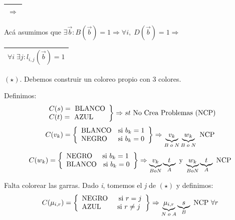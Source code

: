 \documentclass[12pt,a4paper]{report}
\newcounter{neq}
\begin{document}
  			\pagebreak
  			\begin{tabular}{|c|} \hline $\Rightarrow$ \\\hline \end{tabular}
  				\par Acá asumimos que $\exists \overrightarrow{b} : B(\overrightarrow{b}) = 1 \Rightarrow \forall i, \; D(\overrightarrow{b}) = 1 \Rightarrow$ \begin{tabular}{|c|} \hline $\forall i \; \exists j : l_{i, j}(\overrightarrow{b}) = 1$ \\ \hline \end{tabular} $(\star)$. Debemos construir un coloreo propio con 3 colores.
  				\vspace{3mm}
  				\par Definimos:
  				\begin{equation*}
  		  		\left.
  		  		\begin{array}{l}
  		    		C(s) = \textup{ BLANCO} \\
  		    		C(t) = \textup{ AZUL}
  		  		\end{array}
  		 			\right\rbrace
  		 			\Rightarrow s t \textup{ No Crea Problemas (NCP)}
  				\end{equation*}
  				\begin{equation*}
  					C(v_{k}) =
  					\left\lbrace
  		  		\begin{array}{l}
  		    		\textup{BLANCO \; si } b_{k} = 1 \\
  		    		\textup{NEGRO \; \; si } b_{k} = 0
  					\end{array}
  		 			\right\rbrace
  		 			\Rightarrow \underbrace{v_{k}}_{B \; o \; N} \underbrace{w_{k}}_{B \; o \; N} \textup{ NCP}
  				\end{equation*}
  				\begin{equation*}
  					C(w_{k}) =
  		  		\left\lbrace
  					\begin{array}{l}
  	  		 		\textup{NEGRO \; \, si } b_{k} = 1 \\
  	  		 		\textup{BLANCO \; si } b_{k} = 0
  					\end{array}
  				 	\right\rbrace
  				 	\Rightarrow \underbrace{v_{k}}_{B o N} \underbrace{t}_{A}  \textup { y } \underbrace{w_{k}}_{B o N} \underbrace{t}_{A} \textup{ NCP}
  				\end{equation*}

  				\par Falta colorear las garras. Dado \textit{i}, tomemos el \textit{j} de $(\star )$ y definimos:
  				\begin{equation*}
  					C(\mu_{i, r}) =
  		  		\left\lbrace
  					\begin{array}{l}
  	  		 		\textup{NEGRO \; \; si } r = j \\
  	  		 		\textup{AZUL \qquad si } r \neq j
  					\end{array}
  				 	\right\rbrace
  				 	\Rightarrow \underbrace{\mu_{i, r}}_{N \; o \; A} \underbrace{s}_{B} \textup{ NCP } \forall r
  				\end{equation*}
\end{document}
